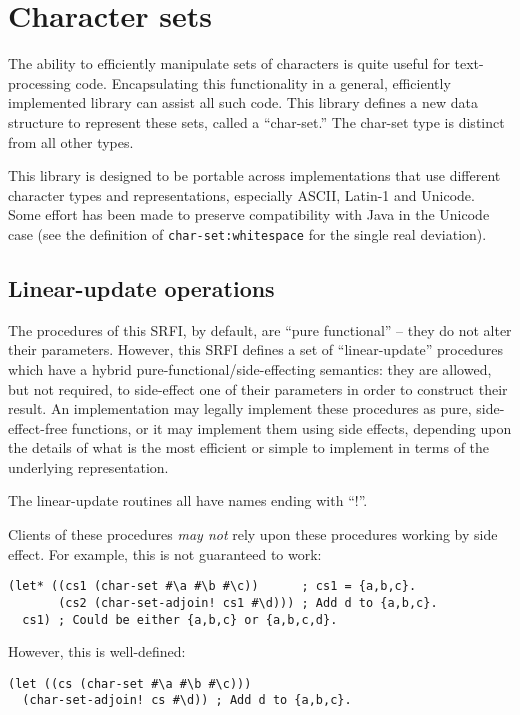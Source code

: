 \section{Character sets}

The ability to efficiently manipulate sets of characters is quite useful
for text-processing code. Encapsulating this functionality in a general,
efficiently implemented library can assist all such code. This library
defines a new data structure to represent these sets, called a
``char-set.'' The char-set type is distinct from all other types.

This library is designed to be portable across implementations that use
different character types and representations, especially ASCII, Latin-1
and Unicode. Some effort has been made to preserve compatibility with
Java in the Unicode case (see the definition of
\texttt{char-set:whitespace} for the single real deviation).

\subsection{{Linear-update operations}}\label{linear-update-operations}

The procedures of this SRFI, by default, are ``pure functional'' -- they
do not alter their parameters. However, this SRFI defines a set of
``linear-update'' procedures which have a hybrid
pure-functional/side-effecting semantics: they are allowed, but not
required, to side-effect one of their parameters in order to construct
their result. An implementation may legally implement these procedures
as pure, side-effect-free functions, or it may implement them using side
effects, depending upon the details of what is the most efficient or
simple to implement in terms of the underlying representation.

The linear-update routines all have names ending with ``!''.

Clients of these procedures \emph{may not} rely upon these procedures
working by side effect. For example, this is not guaranteed to work:

\begin{verbatim}
(let* ((cs1 (char-set #\a #\b #\c))      ; cs1 = {a,b,c}.
       (cs2 (char-set-adjoin! cs1 #\d))) ; Add d to {a,b,c}.
  cs1) ; Could be either {a,b,c} or {a,b,c,d}.
\end{verbatim}

However, this is well-defined:

\begin{verbatim}
(let ((cs (char-set #\a #\b #\c)))
  (char-set-adjoin! cs #\d)) ; Add d to {a,b,c}.
\end{verbatim}

